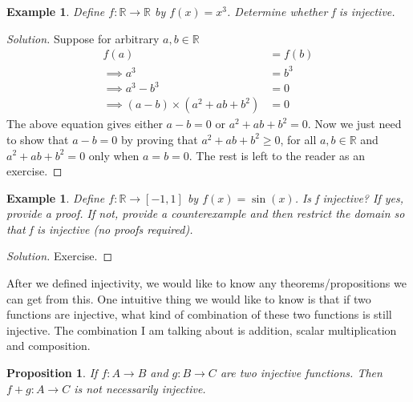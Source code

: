 \documentclass{book}
\newtheorem{example}[theorem]{Example}
\newtheorem{proposition}[theorem]{Proposition}
\begin{document}
\begin{example}
    Define $f : \mathbb{R} \rightarrow \mathbb{R}$ by $f(x) = x^{3}$. Determine whether f is injective.
\end{example}
\begin{proof}[Solution]
    Suppose for arbitrary $a, b \in \mathbb{R}$
    \begin{align*}
        f(a) & = f(b) \\
        \implies a^{3} & = b^{3} \\
        \implies a^{3} - b^{3} & = 0 \\
        \implies (a - b) \times (a^{2} + ab + b^{2}) & = 0
    \end{align*}
    The above equation gives either $a - b = 0$ or $a^{2} + ab + b^{2} = 0$. Now we just need to show that $a - b = 0$ by proving that $a^{2} + ab + b^{2} \geq 0$, for all $a, b \in \mathbb{R}$ and $a^{2} + ab + b^{2} = 0$ only when $a = b = 0$. The rest is left to the reader as an exercise.
\end{proof}

\begin{example}
    Define $f : \mathbb{R} \rightarrow [-1, 1]$ by $f(x) = \sin(x)$. Is f injective? If yes, provide a proof. If not, provide a counterexample and then restrict the domain so that f is injective (no proofs required).
\end{example}

\begin{proof}[Solution]
    Exercise.
\end{proof}

After we defined injectivity, we would like to know any theorems/propositions we can get from this. One intuitive thing we would like to know is that if two functions are injective, what kind of combination of these two functions is still injective. The combination I am talking about is addition, scalar multiplication and composition.

\begin{proposition}
    If $f : A \rightarrow B$ and $g : B \rightarrow C$ are two injective functions. Then $f + g : A \rightarrow C$ is not necessarily injective.
\end{proposition}
\end{document}
